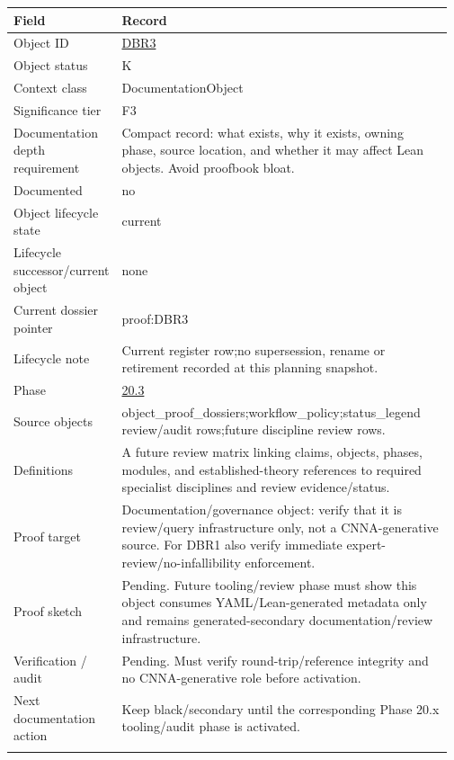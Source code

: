 \begin{longtable}{L{0.16\linewidth} L{0.81\linewidth}}
\hline
\textbf{Field} & \textbf{Record}\\
\hline
Object ID & \hyperlink{object-row-DBR3}{DBR3}\\
\hline\addlinespace[0.20em]
Object status & K\\
\hline\addlinespace[0.20em]
Context class & DocumentationObject\\
\hline\addlinespace[0.20em]
Significance tier & F3\\
\hline\addlinespace[0.20em]
Documentation depth requirement & Compact record: what exists, why it exists, owning phase, source location, and whether it may affect Lean objects. Avoid proofbook bloat.\\
\hline\addlinespace[0.20em]
Documented & no\\
\hline\addlinespace[0.20em]
Object lifecycle state & current\\
\hline\addlinespace[0.20em]
Lifecycle successor/\allowbreak{}current object & none\\
\hline\addlinespace[0.20em]
Current dossier pointer & proof:DBR3\\
\hline\addlinespace[0.20em]
Lifecycle note & Current register row;\newline no supersession, rename or retirement recorded at this planning snapshot.\\
\hline\addlinespace[0.20em]
Phase & \hyperlink{phase-row-20-3}{20.3}\\
\hline\addlinespace[0.20em]
Source objects & object\_proof\_dossiers;\newline workflow\_policy;\newline status\_legend review/\allowbreak{}audit rows;\newline future discipline review rows.\\
\hline\addlinespace[0.20em]
Definitions & A future review matrix linking claims, objects, phases, modules, and established-theory references to required specialist disciplines and review evidence/\allowbreak{}status.\\
\hline\addlinespace[0.20em]
Proof target & Documentation/\allowbreak{}governance object: verify that it is review/\allowbreak{}query infrastructure only, not a CNNA-generative source. For DBR1 also verify immediate expert-review/\allowbreak{}no-infallibility enforcement.\\
\hline\addlinespace[0.20em]
Proof sketch & Pending. Future tooling/\allowbreak{}review phase must show this object consumes YAML/\allowbreak{}Lean-generated metadata only and remains generated-secondary documentation/\allowbreak{}review infrastructure.\\
\hline\addlinespace[0.20em]
Verification /\allowbreak{} audit & Pending. Must verify round-trip/\allowbreak{}reference integrity and no CNNA-generative role before activation.\\
\hline\addlinespace[0.20em]
Next documentation action & Keep black/\allowbreak{}secondary until the corresponding Phase 20.x tooling/\allowbreak{}audit phase is activated.\\
\hline\addlinespace[0.20em]
\end{longtable}
